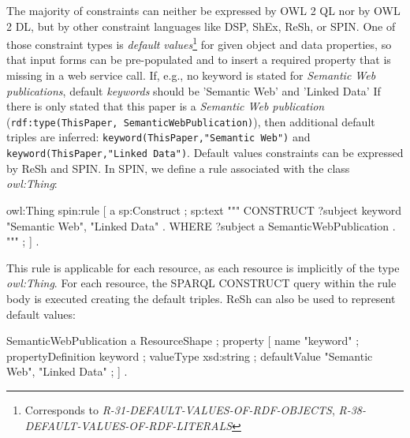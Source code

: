 \documentclass{llncs}
\newcommand{\ms}[1]{\texttt{#1}}
\begin{document}
The majority of constraints can neither be expressed by OWL 2 QL nor by OWL 2 DL, but by other constraint languages like DSP, ShEx, ReSh, or SPIN.
One of those constraint types is
{\em default values}\footnote{Corresponds to {\em R-31-DEFAULT-VALUES-OF-RDF-OBJECTS}, {\em R-38-DEFAULT-VALUES-OF-RDF-LITERALS}}
for given object and data properties, 
so that input forms can be pre-populated and to insert a required property that is missing in a web service call. 
If, e.g., no keyword is stated for \emph{Semantic Web publications}, default \emph{keywords} should be 'Semantic Web' and 'Linked Data'
If there is only stated that this paper is a \emph{Semantic Web publication} (\ms{rdf:type(ThisPaper, SemanticWebPublication)}), 
then additional default triples are inferred: 
\ms{keyword(ThisPaper,"Semantic Web")} and \ms{keyword(ThisPaper,"Linked Data")}.
Default values constraints can be expressed by ReSh and SPIN.
In SPIN, we define a rule associated with the class {\em owl:Thing}:
\begin{ex}
owl:Thing spin:rule [ a sp:Construct ; sp:text """
    CONSTRUCT { ?subject keyword "Semantic Web", "Linked Data" . }
    WHERE { ?subject a SemanticWebPublication . } """ ; ] .
\end{ex}
This rule is applicable for each resource, as each resource is implicitly of the type {\em owl:Thing}. 
For each resource, the SPARQL CONSTRUCT query within the rule body is executed creating the default triples.
ReSh can also be used to represent default values:
\begin{ex}
SemanticWebPublication a ResourceShape ; property [
    name "keyword" ; propertyDefinition keyword ; valueType xsd:string ;
    defaultValue "Semantic Web", "Linked Data" ; ] .
\end{ex}
\end{document}
